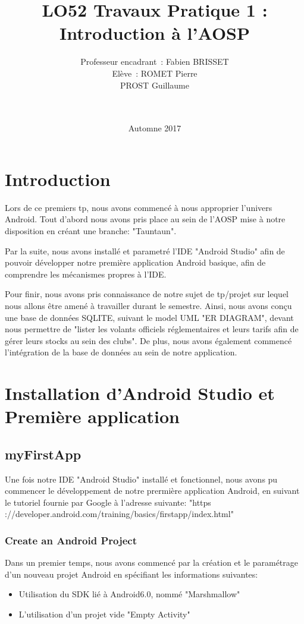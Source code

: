 \documentclass[french,a4paper,12pt]{report}
\title{LO52 Travaux Pratique 1 :\\ Introduction à l'AOSP}
\author{Professeur encadrant : Fabien BRISSET \\ Elève : ROMET Pierre
\\PROST Guillaume \\ \\ \\}
\date{Automne 2017}
\begin{document}
\maketitle
\tableofcontents

\chapter{Introduction}
Lors de ce premiers tp, nous avons commencé à nous approprier l'univers Android.
Tout d'abord nous avons pris place au sein de l'AOSP mise à notre disposition
en créant une branche: "Tauntaun".

Par la suite, nous avons installé et parametré l'IDE "Android Studio" afin de
pouvoir développer notre première application Android basique, afin de
comprendre les mécanismes propres à l'IDE.

Pour finir, nous avons pris connaissance de notre sujet de tp/projet sur
lequel nous allons être amené à travailler durant le semestre.
Ainsi, nous avons conçu une base de données SQLITE, suivant le model UML
"ER DIAGRAM", devant nous permettre de "lister les volants officiels
réglementaires et leurs tarifs afin de gérer leurs stocks au sein des clubs".
De plus, nous avons également commencé l'intégration de la base de données au
sein de notre application.


\chapter{Installation d'Android Studio et Première application}
\section{myFirstApp}
Une fois notre IDE "Android Studio" installé et fonctionnel, nous avons pu
commencer le développement de notre prermière application Android, en suivant
le tutoriel fournie par Google à l'adresse suivante:
"https ://developer.android.com/training/basics/firstapp/index.html"
\subsection{Create an Android Project}
Dans un premier temps, nous avons commencé par la création et le paramétrage
d'un nouveau projet Android en spécifiant les informations suivantes:
\begin{itemize}
  \item Utilisation du SDK lié à Android6.0, nommé "Marshmallow"
  \item L'utilisation d'un projet vide "Empty Activity"
\end{itemize}
\end{document}
